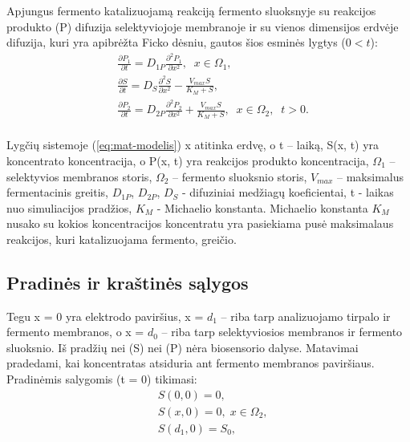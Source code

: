 \documentclass[12pt, a4paper, lithuanian]{article}
\begin{document}
Apjungus fermento katalizuojamą reakciją fermento sluoksnyje su reakcijos
produkto (P) difuzija selektyviojoje membranoje ir su vienos
dimensijos erdvėje difuzija, kuri yra apibrėžta Ficko dėsniu, gautos šios
esminės lygtys ($0<t$):
\begin{equation}
\begin{aligned} 
    \label{eq:mat-modelis}
    &\frac{\partial P_1}{\partial t} = D_{1P} \frac{\partial^2 P_1}{\partial x^2}, \;
    \; x \in \Omega_1,\\
    &\frac{\partial S}{\partial t} = D_S \frac{\partial^2 S}{\partial x^2} -
    \frac{V_{max} S}{K_M + S},  \\ 
    &\frac{\partial P_2}{\partial t} = D_{2P} \frac{\partial^2 P_2}{\partial x^2} +
    \frac{V_{max} S}{K_M + S}, \; \; x \in \Omega_2 ,\;\; t > 0.\\
\end{aligned}
\end{equation}

Lygčių sistemoje (\ref{eq:mat-modelis}) x atitinka erdvę, o t – laiką, S(x, t)
yra koncentrato koncentracija, o P(x, t) yra reakcijos produkto koncentracija,
$\Omega_1$ – selektyvios membranos storis, $\Omega_2$ – fermento sluoksnio
storis, $V_{max}$ – maksimalus fermentacinis greitis, $ D_{1P}$, $ D_{2P}$, $ D_S$ - difuziniai medžiagų koeficientai, t - laikas nuo
simuliacijos pradžios, $ K_M$ - Michaelio konstanta. Michaelio konstanta $K_M$
nusako su kokios koncentracijos koncentratu yra pasiekiama pusė maksimalaus
reakcijos, kuri katalizuojama fermento, greičio.

\subsection{Pradinės ir kraštinės sąlygos}
Tegu x = 0 yra elektrodo paviršius, x = $d_1$ – riba tarp analizuojamo
tirpalo ir fermento membranos, o x = $d_0$ – riba tarp selektyviosios membranos
ir fermento sluoksnio. Iš pradžių nei (S) nei (P) nėra biosensorio
dalyse. Matavimai pradedami, kai koncentratas atsiduria ant fermento membranos
paviršiaus. Pradinėmis salygomis (t = 0) tikimasi:
\begin{equation}
\begin{aligned}
    &S(0,0) = 0, \\
    &S(x, 0) = 0,\; x \in \Omega_2,\\
    &S(d_1, 0) = S_0,
\end{aligned}
\end{equation}
\end{document}
